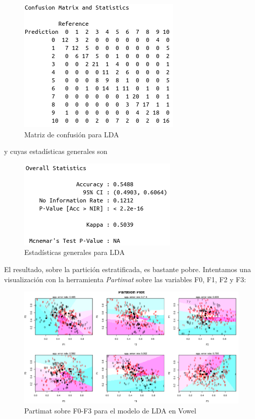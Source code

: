 \begin{figure}[H] %
	\centering
	\includegraphics[scale=0.6]{cm-lda.png}  %
	\caption{Matriz de confusión para LDA} 
	\label{fig:cm-lda}
\end{figure}

y cuyas estadísticas generales son

\begin{figure}[H] %
	\centering
	\includegraphics[scale=0.6]{statis-lda.png}  %
	\caption{Estadísticas generales para LDA} 
	\label{fig:statis-lda}
\end{figure}

El resultado, sobre la partición estratificada, es bastante pobre. Intentamos una visualización con la herramienta \textit{Partimat} sobre las variables F0, F1, F2 y F3:

\begin{figure}[H] %
	\centering
	\includegraphics[scale=0.4]{partimat-lda-v.png}  %
	\caption{Partimat sobre F0-F3 para el modelo de LDA en Vowel} 
	\label{fig:partimat-lda-v}
\end{figure}

